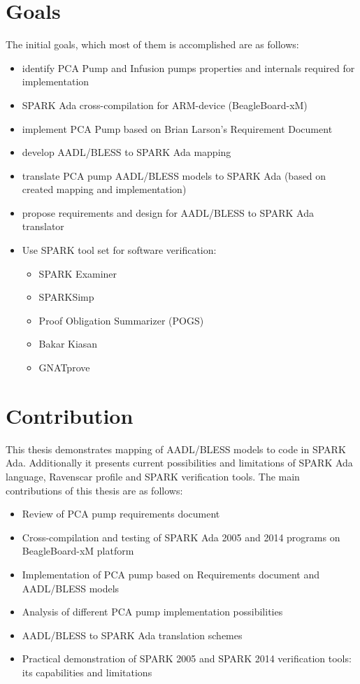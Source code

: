 \section{Goals}
\label{introduction:goals}
The initial goals, which most of them is accomplished are as follows:
\begin{itemize}
	\item identify PCA Pump and Infusion pumps properties and internals required for implementation
	\item SPARK Ada cross-compilation for ARM-device (BeagleBoard-xM)
	\item implement PCA Pump based on Brian Larson's Requirement Document \cite{OpenSourcePCAPump:Paper}
	\item develop AADL/BLESS to SPARK Ada mapping
	\item translate PCA pump AADL/BLESS models to SPARK Ada (based on created mapping and implementation)
	\item propose requirements and design for AADL/BLESS to SPARK Ada translator
	\item Use SPARK tool set for software verification:
		\begin{itemize}
			\item SPARK Examiner
			\item SPARKSimp
			\item Proof Obligation Summarizer (POGS)
			\item Bakar Kiasan
			\item GNATprove
		\end{itemize}
\end{itemize}


\section{Contribution}
\label{introduction:contribution}
This thesis demonstrates mapping of AADL/BLESS models to code in SPARK Ada. Additionally it presents current possibilities and limitations of SPARK Ada language, Ravenscar profile and SPARK verification tools. The main contributions of this thesis are as follows:
\begin{itemize}
	\item Review of PCA pump requirements document \cite{OpenSourcePCAPump:Paper}
	\item Cross-compilation and testing of SPARK Ada 2005 and 2014 programs on BeagleBoard-xM platform
	\item Implementation of PCA pump based on Requirements document \cite{OpenSourcePCAPump:Paper} and AADL/BLESS models
	\item Analysis of different PCA pump implementation possibilities
	\item AADL/BLESS to SPARK Ada translation schemes
	\item Practical demonstration of SPARK 2005 and SPARK 2014 verification tools: its capabilities and limitations
\end{itemize}


